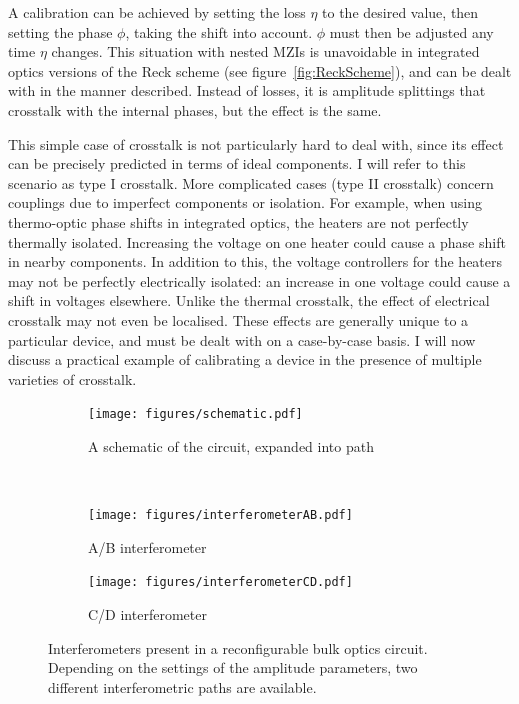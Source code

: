 A calibration can be achieved by setting the loss \(\eta\) to the desired value,
then setting the phase \(\phi\), taking the shift into account. \(\phi\) must
then be adjusted any time \(\eta\) changes. This situation with nested MZIs is
unavoidable in integrated optics versions of the Reck scheme (see
figure~\ref{fig:ReckScheme}), and can be dealt with in the manner described.
Instead of losses, it is amplitude splittings that crosstalk with the internal
phases, but the effect is the same.

This simple case of crosstalk is not particularly hard to deal with, since its
effect can be precisely predicted in terms of ideal components. I will refer to
this scenario as type I crosstalk. More complicated cases (type II crosstalk)
concern couplings due to imperfect components or
isolation. For example, when using thermo-optic phase shifts in integrated
optics, the heaters are not perfectly thermally isolated. Increasing the voltage
on one heater could cause a phase shift in nearby components. In addition to
this, the
voltage controllers for the heaters may not be perfectly electrically isolated:
an increase in one voltage could cause a shift in voltages elsewhere. Unlike the
thermal crosstalk, the effect of electrical crosstalk may not even be
localised. These effects are generally unique to a particular device, and must
be dealt with on a case-by-case basis. I will now discuss a practical example of
calibrating a device in the presence of multiple varieties of crosstalk.

\begin{figure}[t]
  \centering
  \begin{subfigure}{\textwidth}
    \texttt{[image: figures/schematic.pdf]}
    \caption{A schematic of the circuit, expanded into path}
    \label{fig:schematic}
  \end{subfigure} \\
  \vspace{1cm}
  \begin{subfigure}{0.45\textwidth}
    \texttt{[image: figures/interferometerAB.pdf]}
    \caption{A/B interferometer}
    \label{fig:ab}
  \end{subfigure}
  \hspace{0.05\textwidth}
  \begin{subfigure}{0.45\textwidth}
    \texttt{[image: figures/interferometerCD.pdf]}
    \caption{C/D interferometer}
    \label{fig:cd}
  \end{subfigure}
  \caption[Illustration of nested interferometers in the bulk Reck scheme]
  {Interferometers present in a reconfigurable bulk optics circuit. Depending on
  the settings of the amplitude parameters, two different interferometric paths
  are available.}
  \label{fig:interferometers}
\end{figure}

